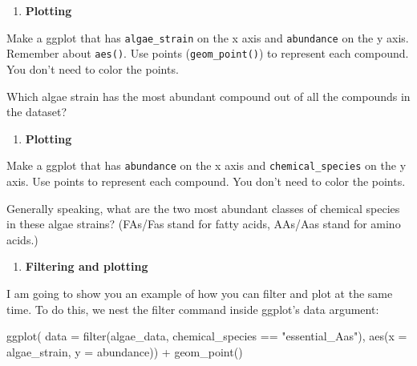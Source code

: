\documentclass[
]{krantz}
\newenvironment{Shaded}{\begin{snugshade}}{\end{snugshade}}
\newcommand{\AttributeTok}[1]{\textcolor[rgb]{0.77,0.63,0.00}{#1}}
\newcommand{\FunctionTok}[1]{\textcolor[rgb]{0.00,0.00,0.00}{#1}}
\newcommand{\NormalTok}[1]{#1}
\newcommand{\SpecialCharTok}[1]{\textcolor[rgb]{0.00,0.00,0.00}{#1}}
\newcommand{\StringTok}[1]{\textcolor[rgb]{0.31,0.60,0.02}{#1}}
\providecommand{\tightlist}{%
  \setlength{\itemsep}{0pt}\setlength{\parskip}{0pt}}
\begin{document}
\begin{enumerate}
\def\labelenumi{\arabic{enumi}.}
\setcounter{enumi}{3}
\tightlist
\item
  \textbf{Plotting}
\end{enumerate}

Make a ggplot that has \texttt{algae\_strain} on the x axis and \texttt{abundance} on the y axis. Remember about \texttt{aes()}. Use points (\texttt{geom\_point()}) to represent each compound. You don't need to color the points.

Which algae strain has the most abundant compound out of all the compounds in the dataset?

\begin{enumerate}
\def\labelenumi{\arabic{enumi}.}
\setcounter{enumi}{4}
\tightlist
\item
  \textbf{Plotting}
\end{enumerate}

Make a ggplot that has \texttt{abundance} on the x axis and \texttt{chemical\_species} on the y axis. Use points to represent each compound. You don't need to color the points.

Generally speaking, what are the two most abundant classes of chemical species in these algae strains? (FAs/Fas stand for fatty acids, AAs/Aas stand for amino acids.)

\begin{enumerate}
\def\labelenumi{\arabic{enumi}.}
\setcounter{enumi}{5}
\tightlist
\item
  \textbf{Filtering and plotting}
\end{enumerate}

I am going to show you an example of how you can filter and plot at the same time. To do this, we nest the filter command inside ggplot's data argument:

\begin{Shaded}
\begin{Highlighting}[]
\FunctionTok{ggplot}\NormalTok{(}
  \AttributeTok{data =} \FunctionTok{filter}\NormalTok{(algae\_data, chemical\_species }\SpecialCharTok{==} \StringTok{"essential\_Aas"}\NormalTok{),}
  \FunctionTok{aes}\NormalTok{(}\AttributeTok{x =}\NormalTok{ algae\_strain, }\AttributeTok{y =}\NormalTok{ abundance)) }\SpecialCharTok{+}
\FunctionTok{geom\_point}\NormalTok{()}
\end{Highlighting}
\end{Shaded}
\end{document}
